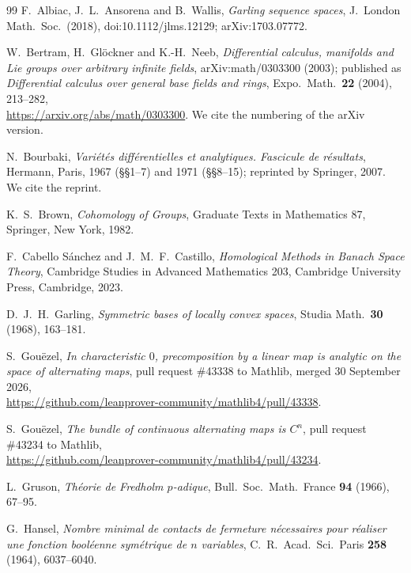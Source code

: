 \documentclass[11pt]{amsart}
\theoremstyle{definition}
\theoremstyle{remark}
\numberwithin{equation}{section}
\theoremstyle{plain}
\theoremstyle{definition}
\theoremstyle{plain}
\begin{document}
\begin{thebibliography}{99}
 F.~Albiac, J.~L.~Ansorena and B.~Wallis, \emph{Garling sequence spaces}, J.\ London Math.\ Soc.\ (2018),
doi:10.1112/jlms.12129; arXiv:1703.07772.

 W.~Bertram, H.~Gl\"ockner and K.-H.~Neeb,
\emph{Differential calculus, manifolds and Lie groups over arbitrary infinite fields},
arXiv:math/0303300 (2003); published as \emph{Differential calculus over general base fields and rings}, Expo.\ Math.\ \textbf{22} (2004), 213--282,\\
{\small\url{https://arxiv.org/abs/math/0303300}}. We cite the numbering of the arXiv version.

 N.~Bourbaki, \emph{Vari\'et\'es diff\'erentielles et analytiques. Fascicule de r\'esultats}, Hermann, Paris,
1967 (\S\S1--7) and 1971 (\S\S8--15); reprinted by Springer, 2007. We cite the reprint.

 K.~S.~Brown, \emph{Cohomology of Groups}, Graduate Texts in Mathematics 87, Springer, New York, 1982.

 F.~Cabello S\'anchez and J.~M.~F.~Castillo, \emph{Homological Methods in Banach Space Theory},
Cambridge Studies in Advanced Mathematics 203, Cambridge University Press, Cambridge, 2023.

 D.~J.~H.~Garling, \emph{Symmetric bases of locally convex spaces}, Studia Math.\ \textbf{30} (1968),
163--181.

 S.~Gou\"ezel, \emph{In characteristic $0$, precomposition by a linear map is analytic on the space of
alternating maps}, pull request \#43338 to Mathlib, merged 30 September 2026,\\ {\small\url{https://github.com/leanprover-community/mathlib4/pull/43338}}.

 S.~Gou\"ezel, \emph{The bundle of continuous alternating maps is $C^n$}, pull request \#43234 to Mathlib,\\
{\small\url{https://github.com/leanprover-community/mathlib4/pull/43234}}.

 L.~Gruson, \emph{Th\'eorie de Fredholm $p$-adique}, Bull.\ Soc.\ Math.\ France \textbf{94} (1966), 67--95.

 G.~Hansel, \emph{Nombre minimal de contacts de fermeture n\'ecessaires pour r\'ealiser une fonction
bool\'eenne sym\'etrique de $n$ variables}, C.~R.\ Acad.\ Sci.\ Paris \textbf{258} (1964), 6037--6040.


\end{thebibliography}
\end{document}

